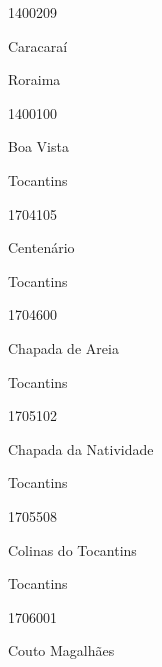 \documentclass[
  letterpaper,
]{report}
\begin{document}
\n      

1400209

\n      

Caracaraí

\n    

\n    

\n      

Roraima

\n      

1400100

\n      

Boa Vista

\n    

\n    

\n      

Tocantins

\n      

1704105

\n      

Centenário

\n    

\n    

\n      

Tocantins

\n      

1704600

\n      

Chapada de Areia

\n    

\n    

\n      

Tocantins

\n      

1705102

\n      

Chapada da Natividade

\n    

\n    

\n      

Tocantins

\n      

1705508

\n      

Colinas do Tocantins

\n    

\n    

\n      

Tocantins

\n      

1706001

\n      

Couto Magalhães
\end{document}

